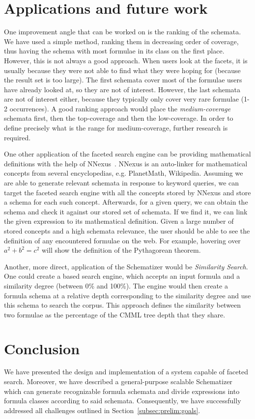 \section{Applications and future work}\label{sec:future}
One improvement angle that can be worked on is the ranking of the schemata.
We have used a simple method, ranking them in decreasing order of coverage,
thus having the schema with most formulae in its class on the first place.
However, this is not always a good approach. When users look at the facets,
it is usually because they were not able to find what they were hoping for
(because the result set is too large). The first schemata cover most of the
formulae users have already looked at, so they are not of interest.
However, the last schemata are not of interest either, because they typically
only cover very rare formulae (1-2 occurrences). A good ranking approach would
place the \textit{medium-coverage} schemata first, then the top-coverage and
then the low-coverage. In order to define precisely what is the range for
medium-coverage, further research is required.

One other application of the faceted search engine can be providing
mathematical definitions with the help of
\textsf{NNexus}~\cite{GinCor:nnexus:14}. NNexus is an auto-linker for
mathematical concepts from several encyclopedias, e.g.  PlanetMath, Wikipedia.
Assuming we are able to generate relevant schemata in response to keyword
queries, we can target the faceted search engine with all the concepts stored
by NNexus and store a schema for each such concept.  Afterwards, for a given
query, we can obtain the schema and check it against our stored set of
schemata. If we find it, we can link the given expression to its mathematical
definition. Given a large number of stored concepts and a high schemata
relevance, the user should be able to see the definition of any encountered
formulae on the web. For example, hovering over $a^2 + b^2 = c^2$ will show the
definition of the Pythagorean theorem.

Another, more direct, application of the Schematizer would be
\textit{Similarity Search}. One could create a \mws based search engine, which
accepts an input formula and a similarity degree (between 0\% and 100\%). The
engine would then create a formula schema at a relative depth corresponding to
the similarity degree and use this schema to search the corpus. This approach
defines the similarity between two formulae as the percentage of the CMML tree
depth that they share.

\section{Conclusion}\label{sec:conclusion}
We have presented the design and implementation of a system capable of faceted
search. Moreover, we have described a general-purpose scalable Schematizer
which can generate recognizable formula schemata and divide expressions into
formula classes according to said schemata. Consequently, we have successfully
addressed all challenges outlined in Section~\ref{subsec:prelim:goals}.

